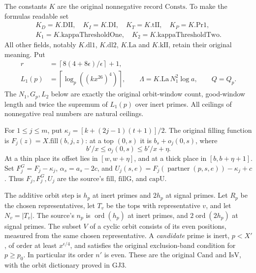 \documentclass[11pt,a4paper]{article}
\numberwithin{equation}{section}
\theoremstyle{remark}\newtheorem{remark}[theorem]{Remark}
\begin{document}
The constants \(K\) are the original nonnegative record
\(\mathrm{Consts}\). To make the formulas readable set
\[
 \begin{gathered}
 K_D=K.\mathrm{DII},\quad K_I=K.\mathrm{DI},\quad
 K_T=K.\mathrm{tII},\quad K_P=K.\mathrm{Pr1},\\
 K_1=K.\mathrm{kappaThresholdOne},\quad
 K_2=K.\mathrm{kappaThresholdTwo}.
 \end{gathered}
\]
All other fields, notably \(K.\mathrm{dl1}\), \(K.\mathrm{dl2}\),
\(K.\mathrm{La}\) and \(K.\mathrm{kII}\), retain their original
meaning. Put
\[
 \begin{split}
 r&=\left\lceil8(4+8\epsilon)/\epsilon\right\rceil+1,\\
 L_1(p)&=\left\lceil\log_p((kx^{26})^4)\right\rceil,\qquad
 \Lambda=K.\mathrm{La}\,N_1^2\log a,\qquad Q=Q_p .
 \end{split}                                                       \tag{GLG.3}
\]
The \(N_1,G_p,L_2\) below are exactly the original orbit-window count,
good-window length and twice the supremum of \(L_1(p)\) over inert
primes. All ceilings of nonnegative real numbers are natural ceilings.

For \(1\le j\le m\), put
\(\kappa_j=[k+(2j-1)(t+1)]/2\).
The original filling function is \(F_j(z)=X.\mathrm{fill}(b,j,z)\):
at a top \((0,s)\) it is \(b_s+o_j(0,s)\), where
\[
 b'/x\le o_j(0,s)\le b'/x+\eta.
\]
At a thin place its offset lies in \([w,w+\eta]\), and at a thick
place in \([b,b+\eta+1]\). Set
\(F_j^G=F_j-\kappa_j\), \(\alpha_s=a_s-2c\), and
\(U_j(s,e)=F_j(\operatorname{partner}(p,s,e))-\kappa_j+c\).
Thus \(F_j,F_j^G,U_j\) are the source's \(\mathrm{fill}\),
\(\mathrm{fillG}\), and \(\mathrm{capU}\).

The additive orbit step is \(h_p\) at inert primes and \(2h_p\)
at signal primes. Let \(R_p\) be the chosen representatives, let
\(T_v\) be the tops with representative \(v\), and let \(N_v=|T_v|\).
The source's \(n_p\) is \(\operatorname{ord}(h_p)\) at inert primes,
and \(2\operatorname{ord}(2h_p)\) at signal primes. The subset \(V\)
of a cyclic orbit consists of its even positions, measured from the
same chosen representative. A \emph{candidate} prime is inert,
\(p<X'\), of order at least \(x^{\epsilon/4}\), and satisfies the
original exclusion-band condition for \(p\ge p_0\). In particular
its order \(n'\) is even. These are the original \(\mathrm{Cand}\)
and \(\mathrm{IsV}\), with the orbit dictionary proved in GJ3.
\end{document}
